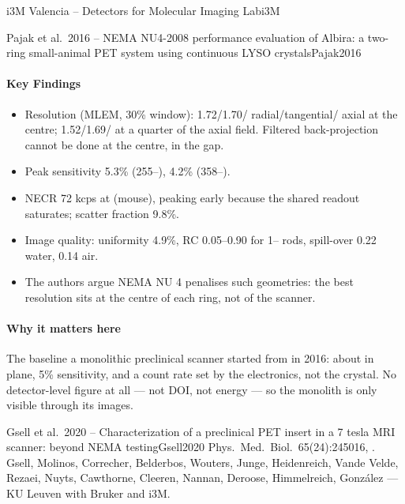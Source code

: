 \begin{programnote}{i3M Valencia -- Detectors for Molecular Imaging Lab}{i3M}
\begin{papernote}{Pajak et al.\ 2016 -- NEMA NU4-2008 performance evaluation of Albira: a two-ring small-animal PET system using continuous LYSO crystals}{Pajak2016}
\paragraph{Key Findings}
\begin{itemize}
	\item Resolution (MLEM, 30\% window): 1.72/1.70/ radial/tangential/
		axial at the centre; 1.52/1.69/ at a quarter of the axial field.
		Filtered back-projection cannot be done at the centre, in the gap.
	\item Peak sensitivity 5.3\% (255--), 4.2\% (358--).
	\item NECR 72 kcps at  (mouse), peaking early because the
		shared readout saturates; scatter fraction 9.8\%.
	\item Image quality: uniformity 4.9\%, RC 0.05--0.90 for 1-- rods,
		spill-over 0.22 water, 0.14 air.
	\item The authors argue NEMA NU 4 penalises such geometries: the best
		resolution sits at the centre of each ring, not of the scanner.
\end{itemize}

\paragraph{Why it matters here}
The baseline a monolithic preclinical scanner started from in 2016: about
 in plane, 5\% sensitivity, and a count rate set by the electronics,
not the crystal. No detector-level figure at all --- not DOI, not energy ---
so the monolith is only visible through its images.

\end{papernote}

\begin{papernote}{Gsell et al.\ 2020 -- Characterization of a preclinical PET insert in a 7 tesla MRI scanner: beyond NEMA testing}{Gsell2020}
Phys.\ Med.\ Biol.\ 65(24):245016, . Gsell,
Molinos, Correcher, Belderbos, Wouters, Junge, Heidenreich, Vande Velde,
Rezaei, Nuyts, Cawthorne, Cleeren, Nannan, Deroose, Himmelreich, González ---
KU Leuven with Bruker and i3M.


\end{papernote}
\end{programnote}
